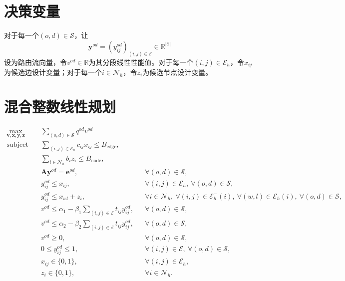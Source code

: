 \documentclass{article}
\begin{document}
\section*{决策变量}
对于每一个\((o,d)\in\mathcal S\)，让
\[
\mathbf y^{od}=(y_{ij}^{od})_{(i,j)\in\mathcal E}\in\mathbb R^{|\mathcal E|}
\]
设为路由流向量，令\(v^{od}\in\mathbb R\)为其分段线性性能值。对于每一个\((i,j)\in\mathcal E_h\)，令\(x_{ij}\)为候选边设计变量；对于每一个\(i\in\mathcal N_h\)，令\(z_i\)为候选节点设计变量。

\section*{混合整数线性规划}
\begin{align}
\max_{\mathbf v,\mathbf x,\mathbf y,\mathbf z}\quad
& \sum_{(o,d)\in\mathcal S}q^{od}v^{od} \label{obj}\\
\text{subject to}\quad
& \sum_{(i,j)\in\mathcal E_h}c_{ij}x_{ij}
  \leq B_{\mathrm{edge}}, \label{edge-budget}\\
& \sum_{i\in\mathcal N_h}b_i z_i
  \leq B_{\mathrm{node}}, \label{node-budget}\\
& \mathbf A\mathbf y^{od}=\mathbf e^{od},
  && \forall (o,d)\in\mathcal S, \label{flow-balance}\\
& y_{ij}^{od}\leq x_{ij},
  && \forall (i,j)\in\mathcal E_h,\ \forall (o,d)\in\mathcal S, \label{edge-linking}\\
& y_{ij}^{od}\leq x_{wl}+z_i,
  && \forall i\in\mathcal N_h,\ \forall (i,j)\in\mathcal E_h^{-}(i),
     \ \forall (w,l)\in\mathcal E_h(i),\ \forall (o,d)\in\mathcal S, \label{node-linking}\\
& v^{od}\leq \alpha_1-\beta_1\sum_{(i,j)\in\mathcal E}t_{ij}y_{ij}^{od},
  && \forall (o,d)\in\mathcal S, \label{piece-one}\\
& v^{od}\leq \alpha_2-\beta_2\sum_{(i,j)\in\mathcal E}t_{ij}y_{ij}^{od},
  && \forall (o,d)\in\mathcal S, \label{piece-two}\\
& v^{od}\geq 0,
  && \forall (o,d)\in\mathcal S, \label{value-domain}\\
& 0\leq y_{ij}^{od}\leq 1,
  && \forall (i,j)\in\mathcal E,\ \forall (o,d)\in\mathcal S, \label{flow-domain}\\
& x_{ij}\in\{0,1\},
  && \forall (i,j)\in\mathcal E_h, \label{edge-domain}\\
& z_i\in\{0,1\},
  && \forall i\in\mathcal N_h. \label{node-domain}
\end{align}
\end{document}
